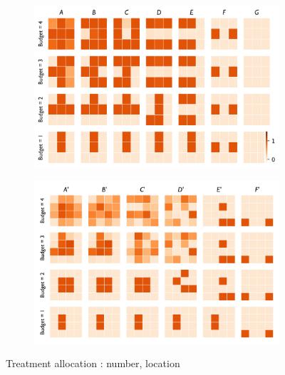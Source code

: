 \begin{figure}[H]
\begin{subfigure}[b]{0.48\textwidth}
         \caption{}
         \label{fig:treatments_number4}
    \end{subfigure}
    \hfill
     \begin{subfigure}[b]{0.44\textwidth}
         \centering
         \includegraphics[width=\textwidth]{figures/wildland/treatments3.png}
         \caption{}
         \label{fig:treatments_pattern3}
     \end{subfigure}
     \begin{subfigure}[b]{0.44\textwidth}
         \centering
         \includegraphics[width=\textwidth]{figures/wildland/treatments4.png}
         \caption{}
         \label{fig:treatments_pattern4}
     \end{subfigure}    
        \caption{Treatment allocation : number, location}
        \label{fig:treatments}
\end{figure}

\clearpage
